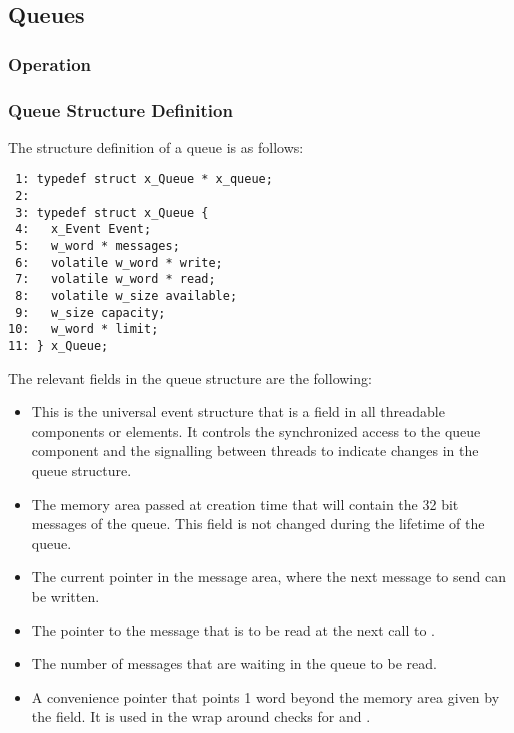 %
%

\subsection{Queues}

\subsubsection{Operation}

\subsubsection{Queue Structure Definition}

The structure definition of a queue is as follows:

\bcode
\begin{verbatim}
 1: typedef struct x_Queue * x_queue;
 2:
 3: typedef struct x_Queue {
 4:   x_Event Event;
 5:   w_word * messages;
 6:   volatile w_word * write;
 7:   volatile w_word * read;
 8:   volatile w_size available;
 9:   w_size capacity;
10:   w_word * limit;
11: } x_Queue;
\end{verbatim}
\ecode

The relevant fields in the queue structure are the following:

\begin{itemize}
\item {} This is the universal event structure that is a field
in all threadable components or elements. It controls the synchronized access
to the queue component and the signalling between threads to indicate changes
in the queue structure.
\item {} The memory area passed at
creation time that will contain the 32 bit messages of the queue. This field
is not changed during the lifetime of the queue.
\item {} The current pointer in the message
area, where the next message to send can be written.
\item {} The pointer to the message that is
to be read at the next call to .
\item {} The number of messages that
are waiting in the queue to be read.
\item {} A convenience pointer that points
1 word beyond the memory area given by the  field. It is
used in the wrap around checks for  and .
\end{itemize}

